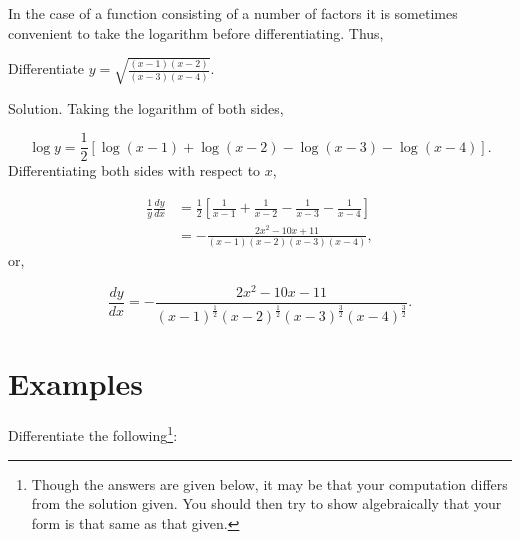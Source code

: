 In the case of a function consisting of a number of factors it is sometimes 
convenient to take the logarithm before differentiating. Thus,

\begin{example}
{\rm
Differentiate $y = \sqrt{\frac{(x - 1)(x - 2)}{(x - 3)(x - 4)}}$.

Solution. Taking the logarithm of both sides,

\[
    \log y = \frac{1}{2} [\log (x -1) + \log (x - 2) - \log(x - 3) - \log(x - 4)].
\]
Differentiating both sides with respect to $x$,

\[
\begin{array}{ll}
\frac{1}{y} \frac{dy}{dx} &= \frac{1}{2} \left [ \frac{1}{x - 1} + \frac{1}{x - 2} - \frac{1}{x - 3} - \frac{1}{x - 4} \right ]\\
&	= -\frac{2x^2 - 10x + 11}{(x - 1)(x - 2)(x - 3)(x - 4)},
\end{array}
\]
or, 

\[
\frac{dy}{dx} 	= -\frac{2x^2 - 10x - 11}{(x - 1)^{\frac{1}{2}} (x - 2)^{\frac{1}{2}} ( x - 3)^{\frac{3}{2}} (x - 4)^{\frac{3}{2}}}.
\]
}
\end{example}

\section{Examples}

Differentiate the following\footnote{Though the answers are given 
below, it may be that your computation differs from the solution given.
You should then try to show algebraically that your form is that same 
as that given.}: %

